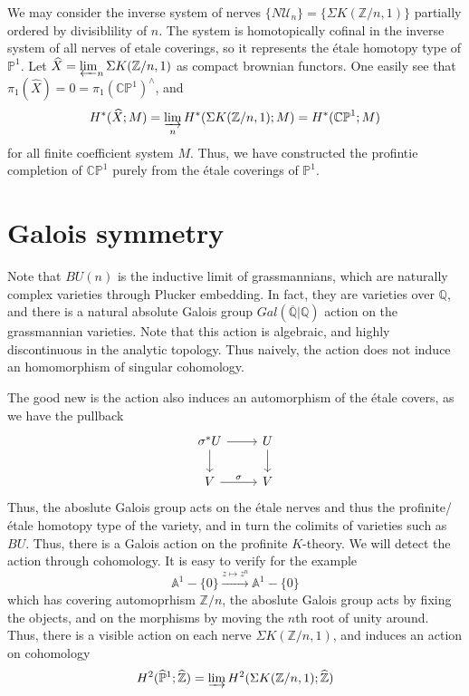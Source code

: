 \documentclass{article}
\theoremstyle{definition}
\theoremstyle{definition}
\theoremstyle{definition}
\theoremstyle{definition}
\theoremstyle{definition}
\theoremstyle{definition}
\theoremstyle{definition}
\begin{document}
We may consider the inverse system of nerves $\{N\mathcal{U}_{n}\}=\{\Sigma K(\mathbb{Z}/n,1)\}$ partially ordered by divisiblility of $n$. The system is homotopically cofinal in the inverse system of all nerves of etale coverings, so it represents the \'etale homotopy type of $\mathbb{P}^1$. Let $\widehat{X}=\varprojlim_n \Sigma K(\mathbb{Z}/n,1)$ as compact brownian functors. One easily see that $\pi_1(\widehat{X})=0=\pi_1(\mathbb{CP}^1)^{\wedge}$, and 
\[H^*(\widehat{X};M)=\varinjlim_n H^*(\Sigma K(\mathbb{Z}/n,1);M)=H^*(\mathbb{CP}^1;M)\]
for all finite coefficient system $M$. Thus, we have constructed the profintie completion of $\mathbb{CP}^1$ purely from the \'etale coverings of $\mathbb{P}^1$.

\section{Galois symmetry}
Note that $BU(n)$ is the inductive limit of grassmannians, which are naturally complex varieties through Plucker embedding. In fact, they are varieties over $\mathbb{Q}$, and there is a natural absolute Galois group $Gal(\overline{\mathbb{Q}}|\mathbb{Q})$ action on the grassmannian varieties. Note that this action is algebraic, and highly discontinuous in the analytic topology. Thus naively, the action does not induce an homomorphism of singular cohomology.



The good new is the action also induces an automorphism of the \'etale covers, as we have the pullback
\[\begin{tikzcd}
	{\sigma^*U} & U \\
	V & V
	\arrow[from=1-1, to=1-2]
	\arrow[from=1-1, to=2-1]
	\arrow[from=1-2, to=2-2]
	\arrow["\sigma", from=2-1, to=2-2]
\end{tikzcd}\]
Thus, the aboslute Galois group acts on the \'etale nerves and thus the profinite/\'etale homotopy type of the variety, and in turn the colimits of varieties such as $BU$. Thus, there is a Galois action on the profinite $K$-theory. We will detect the action through cohomology. It is easy to verify for the example 
\[\mathbb{A}^1-\{0\}\xrightarrow{z\mapsto z^n}\mathbb{A}^1-\{0\}\]
which has covering automoprhism $\mathbb{Z}/n$, the aboslute Galois group acts by fixing the objects, and on the morphisms by moving the $n$th root of unity around. Thus, there is a visible action on each nerve $\Sigma K(\mathbb{Z}/n,1)$, and induces an action on cohomology
\[H^2(\widehat{\mathbb{P}}^1;\widehat{\mathbb{Z}})=\varinjlim H^2(\Sigma K(\mathbb{Z}/n,1);\widehat{\mathbb{Z}})\]
\end{document}
